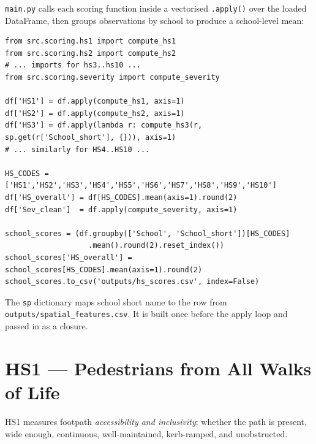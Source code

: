 \documentclass[11pt,a4paper,openany]{book}
\begin{document}
\texttt{main.py} calls each scoring function inside a vectorised \texttt{.apply()} over the loaded DataFrame, then groups observations by school to produce a school-level mean:

\begin{lstlisting}[style=python, caption={Scoring invocation in main.py (simplified).}]
from src.scoring.hs1 import compute_hs1
from src.scoring.hs2 import compute_hs2
# ... imports for hs3..hs10 ...
from src.scoring.severity import compute_severity

df['HS1'] = df.apply(compute_hs1, axis=1)
df['HS2'] = df.apply(compute_hs2, axis=1)
df['HS3'] = df.apply(lambda r: compute_hs3(r, sp.get(r['School_short'], {})), axis=1)
# ... similarly for HS4..HS10 ...

HS_CODES = ['HS1','HS2','HS3','HS4','HS5','HS6','HS7','HS8','HS9','HS10']
df['HS_overall'] = df[HS_CODES].mean(axis=1).round(2)
df['Sev_clean']  = df.apply(compute_severity, axis=1)

school_scores = (df.groupby(['School', 'School_short'])[HS_CODES]
                   .mean().round(2).reset_index())
school_scores['HS_overall'] = school_scores[HS_CODES].mean(axis=1).round(2)
school_scores.to_csv('outputs/hs_scores.csv', index=False)
\end{lstlisting}

The \texttt{sp} dictionary maps school short name to the row from \texttt{outputs/spatial\_features.csv}. It is built once before the apply loop and passed in as a closure.

\section{HS1 --- Pedestrians from All Walks of Life}

HS1 measures footpath \emph{accessibility and inclusivity}: whether the path is present, wide enough, continuous, well-maintained, kerb-ramped, and unobstructed.
\end{document}
